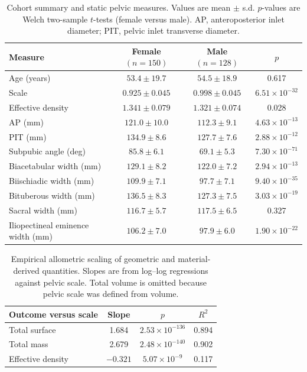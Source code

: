 \documentclass[openacc]{rsproca_new}
\begin{document}
\begin{table}[p]
\centering
\caption{Cohort summary and static pelvic measures. Values are mean $\pm$ s.d. $p$-values are Welch two-sample $t$-tests (female versus male). AP, anteroposterior inlet diameter; PIT, pelvic inlet transverse diameter.}
\label{tab:cohort}
\begin{tabular}{lccc}
\toprule
Measure & Female $(n=150)$ & Male $(n=128)$ & $p$ \\
\midrule
Age (years) & $53.4 \pm 19.7$ & $54.5 \pm 18.9$ & 0.617 \\
Scale & $0.925 \pm 0.045$ & $0.998 \pm 0.045$ & $6.51 \times 10^{-32}$ \\
Effective density & $1.341 \pm 0.079$ & $1.321 \pm 0.074$ & 0.028 \\
AP (mm) & $121.0 \pm 10.0$ & $112.3 \pm 9.1$ & $4.63 \times 10^{-13}$ \\
PIT (mm) & $134.9 \pm 8.6$ & $127.7 \pm 7.6$ & $2.88 \times 10^{-12}$ \\
Subpubic angle (deg) & $85.8 \pm 6.1$ & $69.1 \pm 5.3$ & $7.30 \times 10^{-71}$ \\
Biacetabular width (mm) & $129.1 \pm 8.2$ & $122.0 \pm 7.2$ & $2.94 \times 10^{-13}$ \\
Biischiadic width (mm) & $109.9 \pm 7.1$ & $97.7 \pm 7.1$ & $9.40 \times 10^{-35}$ \\
Bituberous width (mm) & $136.5 \pm 8.3$ & $127.3 \pm 7.5$ & $3.03 \times 10^{-19}$ \\
Sacral width (mm) & $116.7 \pm 5.7$ & $117.5 \pm 6.5$ & 0.327 \\
Iliopectineal eminence width (mm) & $106.2 \pm 7.0$ & $97.9 \pm 6.0$ & $1.90 \times 10^{-22}$ \\
\bottomrule
\end{tabular}
\end{table}

\begin{table}[p]
\centering
\caption{Empirical allometric scaling of geometric and material-derived quantities. Slopes are from log--log regressions against pelvic scale. Total volume is omitted because pelvic scale was defined from volume.}
\label{tab:allometry}
\begin{tabular}{lccc}
\toprule
Outcome versus scale & Slope & $p$ & $R^2$ \\
\midrule
Total surface & 1.684 & $2.53 \times 10^{-136}$ & 0.894 \\
Total mass & 2.679 & $2.48 \times 10^{-140}$ & 0.902 \\
Effective density & $-0.321$ & $5.07 \times 10^{-9}$ & 0.117 \\
\bottomrule
\end{tabular}
\end{table}
\end{document}
